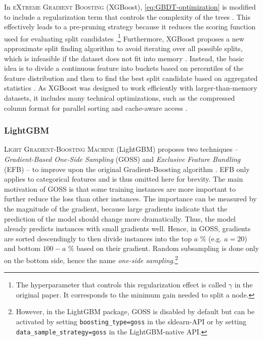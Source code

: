 In \textsc{eXtreme Gradient Boosting} (XGBoost), \cref{eq:GBDT-optimization} is modified to include a regularization term that controls the complexity of the trees \parencite[2]{chen_xgboost_2016}. This effectively leads to a pre-pruning strategy because it reduces the scoring function used for evaluating split candidates \parencites[1941--1942]{bentejac_comparative_2021}.\footnote{The hyperparameter that controls this regularization effect is called $\gamma$ in the original paper. It corresponds to the minimum gain needed to split a node.}
Furthermore, XGBoost proposes a new approximate split finding algorithm to avoid iterating over all possible splits, which is infeasible if the dataset does not fit into memory \parencite[Chapter~3]{chen_xgboost_2016}. Instead, the basic idea is to divide a continuous feature into buckets based on percentiles of the feature distribution and then to find the best split candidate based on aggregated statistics \parencite[Chapter~3.2]{chen_xgboost_2016}.
As XGBoost was designed to work efficiently with larger-than-memory datasets, it includes many technical optimizations, such as the compressed column format for parallel sorting and cache-aware access \parencite[Chapter~4]{chen_xgboost_2016}.

\subsubsection{LightGBM}

\textsc{Light Gradient-Boosting Machine} (LightGBM) proposes two techniques -- \textit{Gradient-Based One-Side Sampling} (GOSS) and \textit{Exclusive Feature Bundling} (EFB) -- to improve upon the original Gradient-Boosting algorithm \parencite[1]{ke_lightgbm_2017}. EFB only applies to categorical features and is thus omitted here for brevity. The main motivation of GOSS is that some training instances are more important to further reduce the loss than other instances. The importance can be measured by the magnitude of the gradient, because large gradients indicate that the prediction of the model should change more dramatically. Thus, the model already predicts instances with small gradients well. Hence, in GOSS, gradients are sorted descendingly to then divide instances into the top $a$ \% (e.g. $a=20$) and bottom $100 - a$ \% based on their gradient. Random subsampling is done only on the bottom side, hence the name \textit{one-side sampling}.\footnote{However, in the LightGBM package, GOSS is disabled by default but can be activated by setting \texttt{boosting\_type=goss} in the sklearn-API or by setting \texttt{data\_sample\_strategy=goss} in the LightGBM-native API.}

